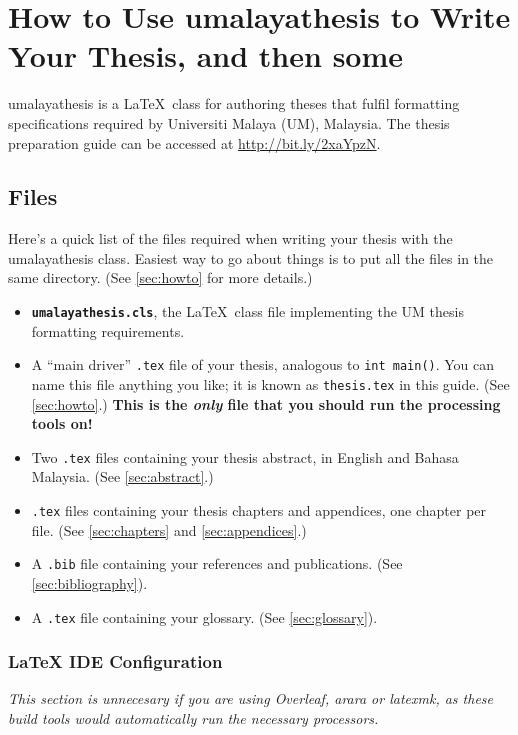 \chapter{How to Use umalayathesis to Write Your Thesis, and then some}

\textsf{umalayathesis} is a \LaTeX\ class for authoring theses that fulfil formatting specifications required by Universiti Malaya (UM), Malaysia. The thesis preparation guide can be accessed at \url{http://bit.ly/2xaYpzN}.


\section{Files}\label{sec:files}
Here's a quick list of the files required when writing your thesis with the \textsf{umalayathesis} class. Easiest way to go about things is to put all the files in the same directory. (See \ref{sec:howto} for more details.)
%
\begin{itemize}
\item \texttt{\bfseries umalayathesis.cls}, the \LaTeX\ class file implementing the UM thesis formatting requirements.
\item A ``main driver'' \texttt{.tex} file of your thesis, analogous to \verb|int main()|. You can name this file anything you like; it is known as \texttt{thesis.tex} in this guide. (See \ref{sec:howto}.) \textbf{This is the \emph{only} file that you should run the processing tools on!}
\item Two \texttt{.tex} files containing your thesis abstract, in English and Bahasa Malaysia. (See \ref{sec:abstract}.)
\item \texttt{.tex} files containing your thesis chapters and appendices, one chapter per file. (See \ref{sec:chapters} and \ref{sec:appendices}.)
\item A \texttt{.bib} file containing your references and  publications. (See \ref{sec:bibliography}).
\item A \texttt{.tex} file containing your glossary. (See \ref{sec:glossary}).
\end{itemize}


\subsection{\LaTeX{} IDE Configuration}\label{sec:texworks}

\emph{This section is unnecesary if you are using Overleaf, arara or latexmk, as these build tools would automatically run the necessary processors.}

